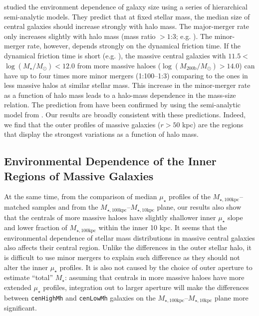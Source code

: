 \documentclass[a4paper,fleqn,usenatbib]{mnras}
\def\rbcg{\texttt{cenHighMh}}
\def\nbcg{\texttt{cenLowMh}}
\def\mstar{{$M_{\star}$}}
\def\logms{{$\log (M_{\star}/M_{\odot})$}}
\def\logmh{{$\log (M_{\mathrm{200b}}/M_{\odot})$}}
\def\minn{{$M_{\star,10\mathrm{kpc}}$}}
\def\mtot{{$M_{\star,100\mathrm{kpc}}$}}
\def\mden{{$\mu_{\star}$}}
\begin{document}
    \citet{Shankar2014} studied the environment dependence of galaxy size using 
    a series of hierarchical semi-analytic models. 
    They predict that at fixed stellar mass, the median size of central galaxies 
    should increase strongly with halo mass. 
    The major-merger rate only increases slightly with halo mass (mass ratio $>1$:3; 
    e.g. \citealt{Hirschmann2013}). 
    The minor-merger rate, however, depends strongly on the dynamical friction time. 
    If the dynamical friction time is short (e.g. \citealt{Newman2012}), the
    massive central galaxies with $11.5 <$\logms{}$<12.0$ from more massive haloes 
    (\logmh{}$>14.0$) can have up to four times more minor mergers (1:100--1:3)
    comparing to the ones in less massive halos at similar stellar mass. 
    This increase in the minor-merger rate as a function of halo mass leads to a 
    halo-mass dependence in the mass-size relation. 
    The prediction from \citet{Shankar2014} have been confirmed by \citet{Yoon2017} 
    using the semi-analytic model from \citet{Guo2011}.  
    Our results are broadly consistent with these predictions. 
    Indeed, we find that the outer profiles of massive galaxies ($r>50$ kpc) are the 
    regions that display the strongest variations as a function of halo mass. 
   
\subsection{Environmental Dependence of the Inner Regions of Massive Galaxies}
    
    At the same time, from the comparison of median \mden{} profiles of the 
    \mtot{}--matched samples and from the \mtot{}--\minn{} plane, our results also 
    show that the centrals of more massive haloes have slightly shallower inner 
    \mden{} slope and lower fraction of \mtot{} within the inner 10 kpc.
    It seems that the environmental dependence of stellar mass distributions in 
    massive central galaxies also affects their central region.
    Unlike the differences in the outer stellar halo, it is difficult to use minor 
    mergers to explain such difference as they should not alter the inner \mden{} 
    profiles. 
    It is also not caused by the choice of outer aperture to estimate ``total''
    \mstar{}: assuming that centrals in more massive haloes have more extended 
    \mden{} profiles, integration out to larger aperture will make the differences 
    between \rbcg{} and \nbcg{} galaxies on the \mtot{}--\minn{} plane more 
    significant. 
    
\end{document}
